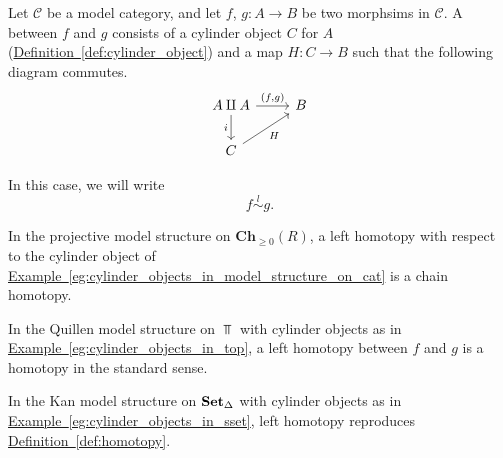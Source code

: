 \documentclass[main.tex]{subfiles}
\begin{document}
\begin{definition}
  \label{def:left_homotopy}
  Let $\mathcal{C}$ be a model category, and let $f$, $g\colon A \to B$ be two morphsims in $\mathcal{C}$. A  between $f$ and $g$ consists of a cylinder object $C$ for $A$ (\hyperref[def:cylinder_object]{Definition~\ref*{def:cylinder_object}}) and a map $H\colon C \to B$ such that the following diagram commutes.
  \begin{equation*}
    \begin{tikzcd}
      A \amalg A
      \arrow[d, swap, "i"]
      \arrow[r, "{(f, g)}"]
      & B
      \\
      C
      \arrow[ur, swap, "H"]
    \end{tikzcd}
  \end{equation*}

  In this case, we will write
  \begin{equation*}
    f \overset{l}{\sim} g.
  \end{equation*}
\end{definition}

\begin{example}
  In the projective model structure on $\mathbf{Ch}_{\geq 0}(R)$, a left homotopy with respect to the cylinder object of \hyperref[eg:cylinder_objects_in_model_structure_on_cat]{Example~\ref*{eg:cylinder_objects_in_model_structure_on_cat}} is a chain homotopy.
\end{example}

\begin{example}
  In the Quillen model structure on $\Top$ with cylinder objects as in \hyperref[eg:cylinder_objects_in_top]{Example~\ref*{eg:cylinder_objects_in_top}}, a left homotopy between $f$ and $g$ is a homotopy in the standard sense.
\end{example}

\begin{example}
  In the Kan model structure on $\operatorname{\mathbf{Set}_{\Delta}}$ with cylinder objects as in \hyperref[eg:cylinder_objects_in_sset]{Example~\ref*{eg:cylinder_objects_in_sset}}, left homotopy reproduces \hyperref[def:homotopy]{Definition~\ref*{def:homotopy}}.
\end{example}
\end{document}
